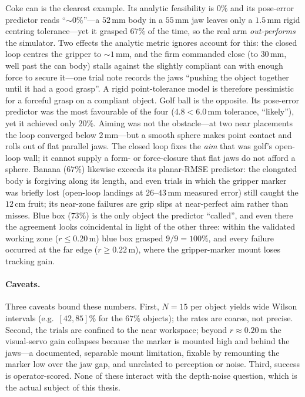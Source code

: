 Coke can is the clearest example. Its analytic feasibility is $0\%$ and its
pose-error predictor reads ``${\sim}0\%$''---a $52$\,mm body in a $55$\,mm jaw
leaves only a $1.5$\,mm rigid centring tolerance---yet it grasped $67\%$ of the
time, so the real arm \emph{out-performs} the simulator. Two effects the
analytic metric ignores account for this: the closed loop centres the gripper to
${\sim}1$\,mm, and the firm commanded close (to $30$\,mm, well past the can body)
stalls against the slightly compliant can with enough force to secure it---one
trial note records the jaws ``pushing the object together until it had a good
grasp''. A rigid point-tolerance model is therefore pessimistic for a forceful
grasp on a compliant object. Golf ball is the opposite. Its pose-error predictor
was the most favourable of the four ($4.8 < 6.0$\,mm tolerance, ``likely''), yet
it achieved only $20\%$. Aiming was not the obstacle---at two near placements
the loop converged below $2$\,mm---but a smooth sphere makes point contact and
rolls out of flat parallel jaws. The closed loop fixes the \emph{aim} that was
golf's open-loop wall; it cannot supply a form- or force-closure that flat jaws
do not afford a sphere. Banana ($67\%$) likewise exceeds its planar-RMSE
predictor: the elongated body is forgiving along its length, and even trials in
which the gripper marker was briefly lost (open-loop landings at $26$--$43$\,mm
measured error) still caught the $12$\,cm fruit; its near-zone failures are grip
slips at near-perfect aim rather than misses. Blue box ($73\%$) is the only
object the predictor ``called'', and even there the agreement looks coincidental
in light of the other three: within the validated working zone ($r \le 0.20$\,m)
blue box grasped $9/9 = 100\%$, and every failure occurred at the far edge
($r \ge 0.22$\,m), where the gripper-marker mount loses tracking gain.

\paragraph{Caveats.}
Three caveats bound these numbers. First, $N=15$ per object yields wide Wilson
intervals (e.g.\ $[42,85]\%$ for the $67\%$ objects); the rates are coarse, not
precise. Second, the trials are confined to the near workspace; beyond
$r \approx 0.20$\,m the visual-servo gain collapses because the marker is mounted
high and behind the jaws---a documented, separable mount limitation, fixable by
remounting the marker low over the jaw gap, and unrelated to perception or noise.
Third, success is operator-scored. None of these interact with the depth-noise
question, which is the actual subject of this thesis.


